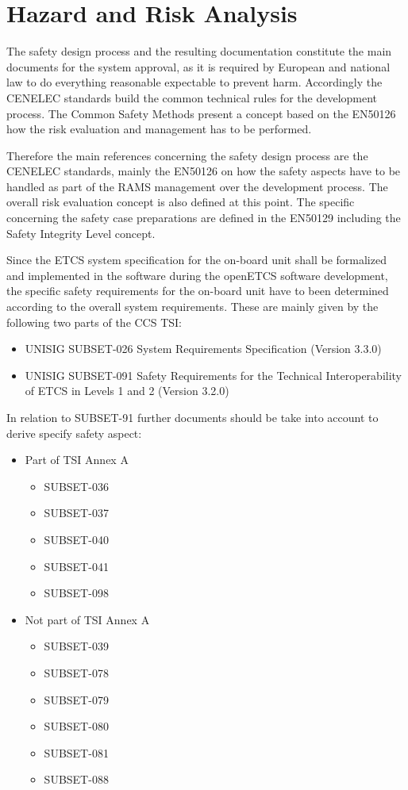 \documentclass{template/openetcs_report}
\begin{document}
\chapter{Hazard and Risk Analysis}
\label{sec:hazardandrisk}
The safety design process and the resulting documentation constitute the main documents for the system approval, as it is required by European and national law to do everything reasonable expectable to prevent harm. Accordingly the CENELEC standards build the common technical rules for the development process. The Common Safety Methods present a concept based on the EN50126 how the risk evaluation and management has to be performed. 

Therefore the main references concerning the safety design process are the CENELEC standards, mainly the EN50126 on how the safety aspects have to be handled as part of the RAMS management over the development process. The overall risk evaluation concept is also defined at this point. The specific concerning the safety case preparations are defined in the EN50129 including the Safety Integrity Level concept. 

Since the ETCS system specification for the on-board unit shall be formalized and implemented in the software during the openETCS software development, the specific safety requirements for the on-board unit have to been determined according to the overall system requirements. These are mainly given by the following two parts of the CCS TSI:

\begin{itemize}
\item UNISIG SUBSET-026	System Requirements Specification 	(Version 3.3.0)
\item UNISIG SUBSET-091 Safety Requirements for the Technical Interoperability of ETCS in Levels 1 and 2 	(Version 3.2.0)
\end{itemize}

In relation to SUBSET-91 further documents should be take into account to derive specify safety aspect:

\begin{itemize}
\item Part of TSI Annex A
	\begin{itemize}
	\item SUBSET-036
	\item SUBSET-037
	\item SUBSET-040
	\item SUBSET-041
	\item SUBSET-098
	\end{itemize}
	
\item Not part of TSI Annex A
	\begin{itemize}
	\item SUBSET-039
	\item SUBSET-078
	\item SUBSET-079
	\item SUBSET-080
	\item SUBSET-081
	\item SUBSET-088
	\end{itemize}
\end{itemize}
\end{document}
